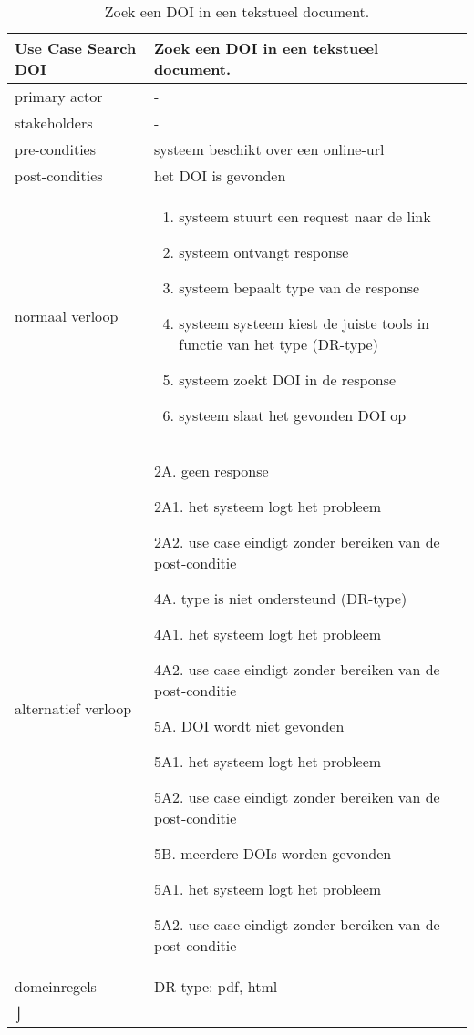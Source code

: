 \begin{table}[ptb]
    \centering
    \begin{tabular}{ | m{5cm} | m{10cm}| } 
        \hline
        \rowcolor{lightgray}
        Use Case Search DOI & Zoek een DOI in een tekstueel document. \\ 
        \hline
        primary actor & - \\ 
        \hline
        stakeholders & - \\ 
        \hline
        pre-condities & systeem beschikt over een online-url \\ 
        \hline
        post-condities & het DOI is gevonden \\ 
        \hline
        normaal verloop & 
        \begin{enumerate}
            \item systeem stuurt een request naar de link
            \item systeem ontvangt response
            \item systeem bepaalt type van de response
            \item systeem systeem kiest de juiste tools in functie van het type (DR-type)
            \item systeem zoekt DOI in de response
            \item systeem slaat het gevonden DOI op
        \end{enumerate} \\ 
        \hline
        alternatief verloop & 
        \begin{description}
            \item 2A. geen response
            \item 2A1. het systeem logt het probleem
            \item 2A2. use case eindigt zonder bereiken van de post-conditie
            \item 4A. type is niet ondersteund (DR-type)
            \item 4A1. het systeem logt het probleem
            \item 4A2. use case eindigt zonder bereiken van de post-conditie
            \item 5A. DOI wordt niet gevonden
            \item 5A1. het systeem logt het probleem
            \item 5A2. use case eindigt zonder bereiken van de post-conditie
            \item 5B. meerdere DOIs worden gevonden
            \item 5A1. het systeem logt het probleem
            \item 5A2. use case eindigt zonder bereiken van de post-conditie
        \end{description} \\ 
        \hline
        domeinregels & DR-type: pdf, html\\⌡ 
        \hline
    \end{tabular}
    \caption{Zoek een DOI in een tekstueel document.}
\end{table}

